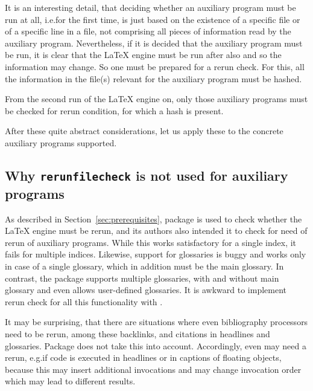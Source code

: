 It is an interesting detail, 
that deciding whether an auxiliary program must be run at all, 
i.e.\@ for the first time, 
is just based on the existence of a specific file 
or of a specific line in a file, 
not comprising all pieces of information read by the auxiliary program. 
Nevertheless, if it is decided that the auxiliary program must be run, 
it is clear that the \LaTeX{} engine must be run after also 
and so the information may change. 
So one must be prepared for a rerun check. 
For this, all the information in the file(s) %
relevant for the auxiliary program must be hashed. 

From the second run of the \LaTeX{} engine on, 
only those auxiliary programs must be checked for rerun condition, 
for which a hash is present. 
\medskip

After these quite abstract considerations, 
let us apply these to the concrete auxiliary programs supported. 





\subsection{Why \texttt{rerunfilecheck} is not used for auxiliary programs}%
\label{subsec:noRerunfilecheck}

As described in Section~\ref{sec:prerequisites}, 
package  is used to check 
whether the \LaTeX{} engine must be rerun, 
and its authors also intended it to check 
for need of rerun of auxiliary programs. 
While this works satisfactory for a single index, 
it fails for multiple indices. 
Likewise, support for glossaries is buggy and works only in case of a single glossary, 
which in addition must be the main glossary. 
In contrast, the package  supports multiple glossaries, 
with and without main glossary 
and even allows user-defined glossaries. 
It is awkward to implement rerun check 
for all this functionality with . 

It may be surprising, that there are situations 
where even bibliography processors need to be rerun, 
among these backlinks, and citations in headlines and glossaries. 
Package  does not take this into account. 
Accordingly, even  may need a rerun, 
e.g.\@ if code is executed in headlines or in captions of floating objects, 
because this may insert additional invocations and may change invocation order 
which may lead to different results. 

